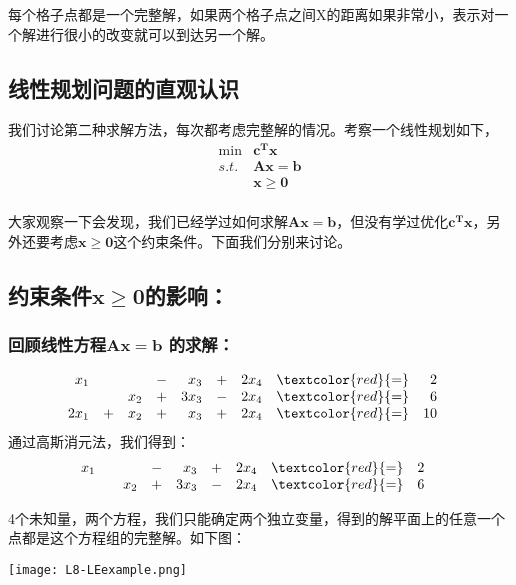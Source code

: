 每个格子点都是一个完整解，如果两个格子点之间X的距离如果非常小，表示对一个解进行很小的改变就可以到达另一个解。

\subsection{线性规划问题的直观认识}
我们讨论第二种求解方法，每次都考虑完整解的情况。考察一个线性规划如下，
\[
\begin{array}{rrrrrrrrrrrrl}
 \min & \mathbf{c^Tx}   \\
 s.t. & \mathbf{Ax = b} \\
      & \mathbf{x \geq 0 }\\
\end{array} \nonumber
\]

大家观察一下会发现，我们已经学过如何求解$\mathbf{Ax=b}$，但没有学过优化$\mathbf{c^Tx}$，另外还要考虑$\mathbf{x \geq 0 }$这个约束条件。下面我们分别来讨论。

\subsection{约束条件$\mathbf{x \geq 0 }$的影响：}
\subsubsection{回顾线性方程$\mathbf{Ax=b}$ 的求解：}
\[
\begin{array}{rrrrrrrrrrrrl}
      x_1 & &             &-& x_3     &+&2x_4  & \textcolor{red}{=} & 2 &  \\
             & & x_{2}    &+& 3x_3  &-&2x_4  &\textcolor{red}{=}& 6 &  \\
       2x_1     &+ & x_{2}    &+& x_3  &+&2x_4  &\textcolor{red}{=}& 10 &
     \end{array} \nonumber
\]
通过高斯消元法，我们得到：
\[
\begin{array}{rrrrrrrrrrrrl}
      x_1 & &             &-& x_3     &+&2x_4  & \textcolor{red}{=} & 2 &  \\
             & & x_{2}    &+& 3x_3  &-&2x_4  &\textcolor{red}{=}& 6 &  \\
     \end{array} \nonumber
\]

4个未知量，两个方程，我们只能确定两个独立变量，得到的解平面上的任意一个点都是这个方程组的完整解。如下图：
\begin{center}
	\texttt{[image: L8-LEexample.png]}
\end{center}


